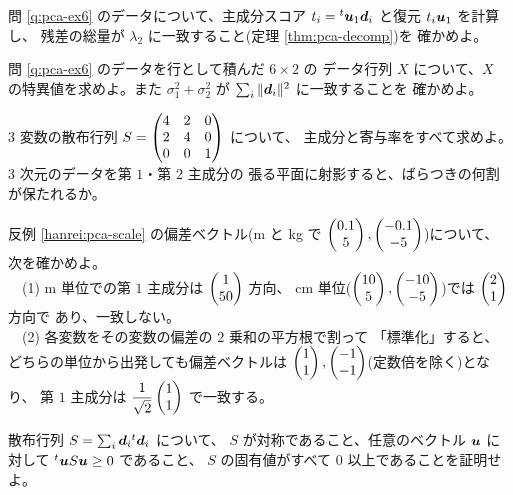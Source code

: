 \begin{mondai}[標準]\label{q:pca-ex7}
問 \ref{q:pca-ex6} のデータについて、主成分スコア
$t_i = {}^t\bm{u}_1\bm{d}_i$ と復元 $t_i\bm{u}_1$ を計算し、
残差の総量が $\lambda_2$ に一致すること(定理 \ref{thm:pca-decomp})を
確かめよ。
\end{mondai}

\begin{mondai}[標準]\label{q:pca-ex8}
問 \ref{q:pca-ex6} のデータを行として積んだ $6 \times 2$ の
データ行列 $X$ について、$X$ の特異値を求めよ。また
$\sigma_1^2 + \sigma_2^2$ が $\sum_i \|\bm{d}_i\|^2$ に一致することを
確かめよ。
\end{mondai}

\begin{mondai}[発展]\label{q:pca-ex9}
$3$ 変数の散布行列
$S = \begin{pmatrix}4 & 2 & 0 \\ 2 & 4 & 0 \\ 0 & 0 & 1\end{pmatrix}$ について、
主成分と寄与率をすべて求めよ。$3$ 次元のデータを第 $1$・第 $2$ 主成分の
張る平面に射影すると、ばらつきの何割が保たれるか。
\end{mondai}

\begin{mondai}[発展]\label{q:pca-ex10}
反例 \ref{hanrei:pca-scale} の偏差ベクトル(m と kg で
$\begin{pmatrix}0.1 \\ 5\end{pmatrix}, \begin{pmatrix}-0.1 \\ -5\end{pmatrix}$)について、次を確かめよ。\\
　(1) m 単位での第 $1$ 主成分は $\begin{pmatrix}1 \\ 50\end{pmatrix}$ 方向、
cm 単位($\begin{pmatrix}10 \\ 5\end{pmatrix}, \begin{pmatrix}-10 \\ -5\end{pmatrix}$)では $\begin{pmatrix}2 \\ 1\end{pmatrix}$ 方向で
あり、一致しない。\\
　(2) 各変数をその変数の偏差の $2$ 乗和の平方根で割って
「標準化」すると、どちらの単位から出発しても偏差ベクトルは
$\begin{pmatrix}1 \\ 1\end{pmatrix}, \begin{pmatrix}-1 \\ -1\end{pmatrix}$(定数倍を除く)となり、
第 $1$ 主成分は $\dfrac{1}{\sqrt{2}}\begin{pmatrix}1 \\ 1\end{pmatrix}$ で一致する。
\end{mondai}

\begin{mondai}[証明]\label{q:pca-ex11}
散布行列 $S = \sum_i \bm{d}_i{}^t\bm{d}_i$ について、
$S$ が対称であること、任意のベクトル $\bm{u}$ に対して
${}^t\bm{u}S\bm{u} \ge 0$ であること、
$S$ の固有値がすべて $0$ 以上であることを証明せよ。
\end{mondai}

